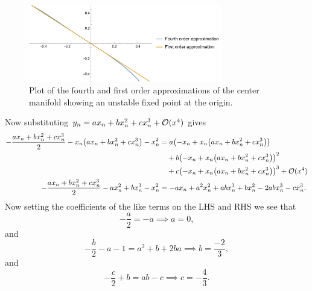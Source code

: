 \documentclass[12pt]{report}
\begin{document}
\begin{solution}
\begin{figure}
                \includegraphics[width=0.75\textwidth,height=\textwidth,keepaspectratio]{images/1.png}
                \caption{Plot of the fourth and first order approximations of the center manifold showing an unstable fixed point at the origin.}
                \label{fig1}
            \end{figure}
    Now substituting $y_n = ax_n + bx_n^2 + cx_n^3 +{\mathcal{O}}(x^4)$ gives
    \begin{align*}
        -\frac{ax_n + bx_n^2 + cx_n^3}{2} - x_n{\left(ax_n + bx_n^2 + cx_n^3\right)} - x_n^2 &= a{\left(-x_n + x_n{\left(ax_n + bx_n^2 + cx_n^3\right)}\right)}\\ 
        &\quad +b{\left(-x_n + x_n{\left(ax_n + bx_n^2 + cx_n^3\right)}\right)}^2\\ 
        &\quad +c{\left(-x_n + x_n{\left(ax_n + bx_n^2 + cx_n^3\right)}\right)}^3 + {\mathcal{O}}(x^4)\\
        -\frac{ax_n + bx_n^2 + cx_n^3}{2} - ax_n^2 +bx_n^3 - x_n^2 &= -ax_n + a^2x_n^2 + abx_n^3 + bx_n^2 - 2abx_n^3 - cx_n^3.
    \end{align*}
    Now setting the coefficients of the like terms on the LHS and RHS we see that
    \[ 
        -\frac{a}{2} = -a \implies a = 0,
    \]
    and 
    \[ 
        -\frac{b}{2} - a - 1 = a^2 + b + 2ba \implies b = \frac{-2}{3},    
    \]
    and 
    \[ 
        -\frac{c}{2} + b = ab - c \implies c = -\frac{4}{3}.
    \]

\end{solution}
\end{document}
